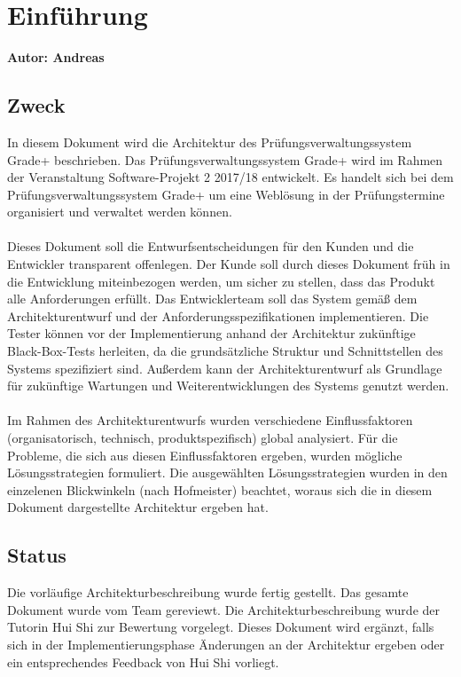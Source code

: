 
\section{Einführung} \label{sec:einführung}

\textbf{Autor: Andreas}\\
\subsection{Zweck} %


{  In diesem Dokument wird die Architektur des Prüfungsverwaltungssystem \glqq{}Grade+\grqq{} 
beschrieben. Das Prüfungsverwaltungssystem \glqq{}Grade+\grqq{}  wird im Rahmen der Veranstaltung Software-Projekt 2 2017/18 entwickelt. Es handelt sich bei dem Prüfungsverwaltungssystem \glqq{}Grade+\grqq{}  um eine Weblösung in der Prüfungstermine organisiert und verwaltet werden können.  \\
\\ %
Dieses Dokument soll die Entwurfsentscheidungen für den Kunden und die Entwickler transparent offenlegen.  Der Kunde soll durch dieses Dokument früh in die Entwicklung miteinbezogen werden, um sicher zu stellen, dass das Produkt alle Anforderungen erfüllt. Das Entwicklerteam soll das System gemäß dem Architekturentwurf und der Anforderungsspezifikationen implementieren. Die Tester können vor der Implementierung anhand der Architektur zukünftige Black-Box-Tests herleiten, da die grundsätzliche Struktur und Schnittstellen des Systems spezifiziert sind. Außerdem kann der Architekturentwurf als Grundlage für zukünftige Wartungen und Weiterentwicklungen des Systems genutzt werden. \\
\\ %
Im Rahmen des Architekturentwurfs wurden verschiedene Einflussfaktoren (organisatorisch, technisch, produktspezifisch) global analysiert. Für die Probleme, die sich aus diesen Einflussfaktoren ergeben, wurden mögliche Lösungsstrategien formuliert. Die ausgewählten Lösungsstrategien wurden in den einzelenen Blickwinkeln (nach Hofmeister) beachtet, woraus sich die in diesem Dokument dargestellte Architektur ergeben hat. }

\subsection{Status}
{ Die vorläufige Architekturbeschreibung wurde fertig gestellt. Das gesamte Dokument wurde vom Team gereviewt. Die Architekturbeschreibung wurde der Tutorin Hui Shi zur Bewertung vorgelegt. Dieses Dokument wird ergänzt, falls sich in der Implementierungsphase Änderungen an der Architektur ergeben oder ein entsprechendes Feedback von Hui Shi vorliegt.}

